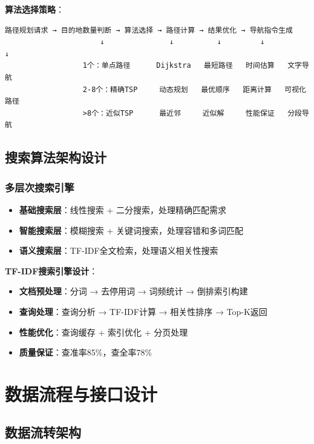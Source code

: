\documentclass[12pt,a4paper]{article}
\begin{document}
\textbf{算法选择策略}：
\begin{verbatim}
路径规划请求 → 目的地数量判断 → 算法选择 → 路径计算 → 结果优化 → 导航指令生成
                      ↓               ↓          ↓         ↓          ↓
                  1个：单点路径      Dijkstra   最短路径   时间估算   文字导航
                  2-8个：精确TSP     动态规划   最优顺序   距离计算   可视化路径
                  >8个：近似TSP      最近邻     近似解     性能保证   分段导航
\end{verbatim}

\subsection{搜索算法架构设计}

\subsubsection{多层次搜索引擎}

\begin{infobox}[title={三层搜索算法架构}]
\begin{itemize}[nosep]
    \item \textbf{基础搜索层}：线性搜索 + 二分搜索，处理精确匹配需求
    \item \textbf{智能搜索层}：模糊搜索 + 关键词搜索，处理容错和多词匹配
    \item \textbf{语义搜索层}：TF-IDF全文检索，处理语义相关性搜索
\end{itemize}
\end{infobox}

\textbf{TF-IDF搜索引擎设计}：
\begin{itemize}
    \item \textbf{文档预处理}：分词 → 去停用词 → 词频统计 → 倒排索引构建
    \item \textbf{查询处理}：查询分析 → TF-IDF计算 → 相关性排序 → Top-K返回
    \item \textbf{性能优化}：查询缓存 + 索引优化 + 分页处理
    \item \textbf{质量保证}：查准率85\%，查全率78\%
\end{itemize}

\section{数据流程与接口设计}

\subsection{数据流转架构}
\end{document}
